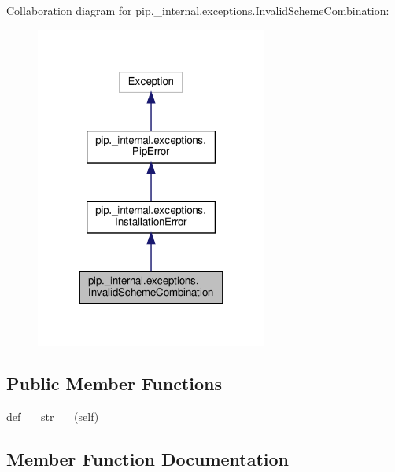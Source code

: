 Collaboration diagram for pip.\+\_\+internal.\+exceptions.\+Invalid\+Scheme\+Combination\+:
\nopagebreak
\begin{figure}[H]
\begin{center}
\leavevmode
\includegraphics[width=216pt]{classpip_1_1__internal_1_1exceptions_1_1InvalidSchemeCombination__coll__graph}
\end{center}
\end{figure}
\subsection*{Public Member Functions}
\begin{DoxyCompactItemize}
\item 
def \hyperlink{classpip_1_1__internal_1_1exceptions_1_1InvalidSchemeCombination_a8f3c654c903a96774b77833b14a2c82d}{\+\_\+\+\_\+str\+\_\+\+\_\+} (self)
\end{DoxyCompactItemize}


\subsection{Member Function Documentation}
\mbox{\label{classpip_1_1__internal_1_1exceptions_1_1InvalidSchemeCombination_a8f3c654c903a96774b77833b14a2c82d}} 
